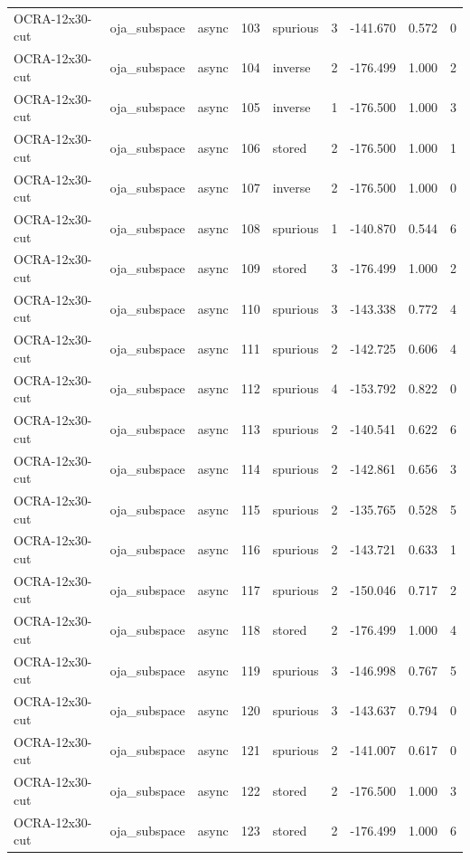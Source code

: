\begin{tabular}{lllrlrrrr}
OCRA-12x30-cut & oja\_subspace & async & 103 & spurious & 3 & -141.670 & 0.572 & 0 \\
OCRA-12x30-cut & oja\_subspace & async & 104 & inverse & 2 & -176.499 & 1.000 & 2 \\
OCRA-12x30-cut & oja\_subspace & async & 105 & inverse & 1 & -176.500 & 1.000 & 3 \\
OCRA-12x30-cut & oja\_subspace & async & 106 & stored & 2 & -176.500 & 1.000 & 1 \\
OCRA-12x30-cut & oja\_subspace & async & 107 & inverse & 2 & -176.500 & 1.000 & 0 \\
OCRA-12x30-cut & oja\_subspace & async & 108 & spurious & 1 & -140.870 & 0.544 & 6 \\
OCRA-12x30-cut & oja\_subspace & async & 109 & stored & 3 & -176.499 & 1.000 & 2 \\
OCRA-12x30-cut & oja\_subspace & async & 110 & spurious & 3 & -143.338 & 0.772 & 4 \\
OCRA-12x30-cut & oja\_subspace & async & 111 & spurious & 2 & -142.725 & 0.606 & 4 \\
OCRA-12x30-cut & oja\_subspace & async & 112 & spurious & 4 & -153.792 & 0.822 & 0 \\
OCRA-12x30-cut & oja\_subspace & async & 113 & spurious & 2 & -140.541 & 0.622 & 6 \\
OCRA-12x30-cut & oja\_subspace & async & 114 & spurious & 2 & -142.861 & 0.656 & 3 \\
OCRA-12x30-cut & oja\_subspace & async & 115 & spurious & 2 & -135.765 & 0.528 & 5 \\
OCRA-12x30-cut & oja\_subspace & async & 116 & spurious & 2 & -143.721 & 0.633 & 1 \\
OCRA-12x30-cut & oja\_subspace & async & 117 & spurious & 2 & -150.046 & 0.717 & 2 \\
OCRA-12x30-cut & oja\_subspace & async & 118 & stored & 2 & -176.499 & 1.000 & 4 \\
OCRA-12x30-cut & oja\_subspace & async & 119 & spurious & 3 & -146.998 & 0.767 & 5 \\
OCRA-12x30-cut & oja\_subspace & async & 120 & spurious & 3 & -143.637 & 0.794 & 0 \\
OCRA-12x30-cut & oja\_subspace & async & 121 & spurious & 2 & -141.007 & 0.617 & 0 \\
OCRA-12x30-cut & oja\_subspace & async & 122 & stored & 2 & -176.500 & 1.000 & 3 \\
OCRA-12x30-cut & oja\_subspace & async & 123 & stored & 2 & -176.499 & 1.000 & 6 \\

\end{tabular}
